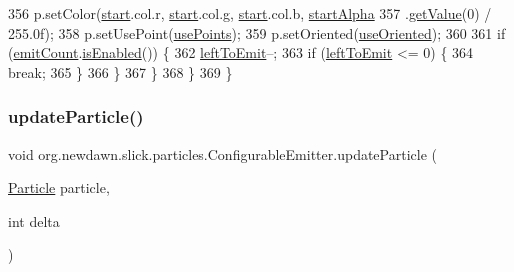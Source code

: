 \begin{DoxyCode}
356                 p.setColor(\mbox{\hyperlink{namespaceejemplo_1_1clase_abcf43191f0ecf3b071ca2db7696ba821}{start}}.col.r, \mbox{\hyperlink{namespaceejemplo_1_1clase_abcf43191f0ecf3b071ca2db7696ba821}{start}}.col.g, \mbox{\hyperlink{namespaceejemplo_1_1clase_abcf43191f0ecf3b071ca2db7696ba821}{start}}.col.b, 
      \mbox{\hyperlink{classorg_1_1newdawn_1_1slick_1_1particles_1_1_configurable_emitter_a491863039baceaaeed937beb77e4a466}{startAlpha}}
357                         .\mbox{\hyperlink{classorg_1_1newdawn_1_1slick_1_1particles_1_1_configurable_emitter_1_1_simple_value_a427ab1df90b809a575492d6e55e7357b}{getValue}}(0) / 255.0f);
358                 p.setUsePoint(\mbox{\hyperlink{classorg_1_1newdawn_1_1slick_1_1particles_1_1_configurable_emitter_a70dbcb61667c957161a8c99b3fd563d6}{usePoints}});
359                 p.setOriented(\mbox{\hyperlink{classorg_1_1newdawn_1_1slick_1_1particles_1_1_configurable_emitter_ab38e5cf019d342ffd95b3164ed209cac}{useOriented}});
360 
361                 \textcolor{keywordflow}{if} (\mbox{\hyperlink{classorg_1_1newdawn_1_1slick_1_1particles_1_1_configurable_emitter_ada09b861f9d81935e3fb2729e2660871}{emitCount}}.\mbox{\hyperlink{classorg_1_1newdawn_1_1slick_1_1particles_1_1_configurable_emitter_1_1_range_a79064f67a7ec003d21a7bf3cf9a8794d}{isEnabled}}()) \{
362                     \mbox{\hyperlink{classorg_1_1newdawn_1_1slick_1_1particles_1_1_configurable_emitter_a3bbb120034b27280fb242f61f3f8e039}{leftToEmit}}--;
363                     \textcolor{keywordflow}{if} (\mbox{\hyperlink{classorg_1_1newdawn_1_1slick_1_1particles_1_1_configurable_emitter_a3bbb120034b27280fb242f61f3f8e039}{leftToEmit}} <= 0) \{
364                         \textcolor{keywordflow}{break};
365                     \}
366                 \}
367             \}
368         \}
369     \}
\end{DoxyCode}
\mbox{\label{classorg_1_1newdawn_1_1slick_1_1particles_1_1_configurable_emitter_afb381373acb3d59327528045c126d0fb}} 
\subsubsection{\texorpdfstring{update\+Particle()}{updateParticle()}}
{\footnotesize\ttfamily void org.\+newdawn.\+slick.\+particles.\+Configurable\+Emitter.\+update\+Particle (\begin{DoxyParamCaption}\item[{\mbox{\hyperlink{classorg_1_1newdawn_1_1slick_1_1particles_1_1_particle}{Particle}}}]{particle,  }\item[{int}]{delta }\end{DoxyParamCaption})\hspace{0.3cm}{\ttfamily [inline]}}

